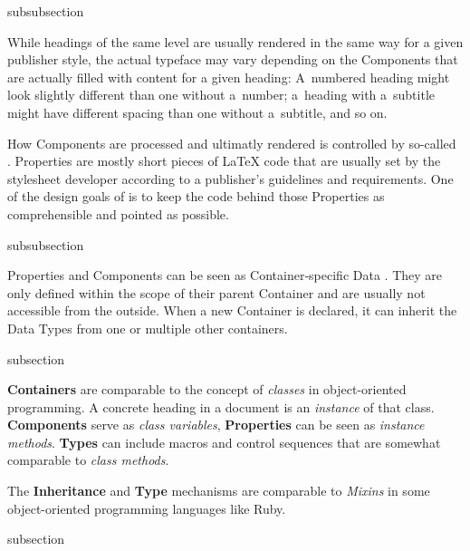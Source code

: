 \begin{Heading}[label=sec:overview.properties]{subsubsection}
\end{Heading}

While headings of the same level are usually rendered in the same way
for a given publisher style, the actual typeface may vary depending on
the Components that are actually filled with content for a given
heading: A~numbered heading might look slightly different than one
without a~number; a~heading with a~subtitle might have different
spacing than one without a~subtitle, and so on.

How Components are processed and ultimatly rendered is controlled by
so-called . Properties are
mostly short pieces of {\LaTeX} code that are usually set by the
stylesheet developer according to a publisher's guidelines and
requirements. One of the design goals of {\CoCoTeX} is to keep the
code behind those Properties as comprehensible and pointed as
possible.

\begin{Heading}[label=sec:overview.types]{subsubsection}
\end{Heading}

Properties and Components can be seen as Container‐specific Data
. They are only defined within the
scope of their parent Container and are usually not accessible from
the outside. When a new Container is declared, it can inherit the Data
Types from one or multiple other containers.

\begin{Heading}[label=sec:oop]{subsection}
\end{Heading}


\textbf{Containers} are comparable to the concept of \textit{classes}
in object-oriented programming. A concrete heading in a document is an
\textit{instance} of that class. \textbf{Components} serve as
\textit{class variables}, \textbf{Properties} can be seen as
\textit{instance methods}. \textbf{Types} can include macros and
control sequences that are somewhat comparable to \textit{class
  methods}.

The \textbf{Inheritance} and \textbf{Type} mechanisms are comparable
to \textit{Mixins} in some object-oriented programming languages like
Ruby.


\begin{Heading}{subsection}
\end{Heading}

